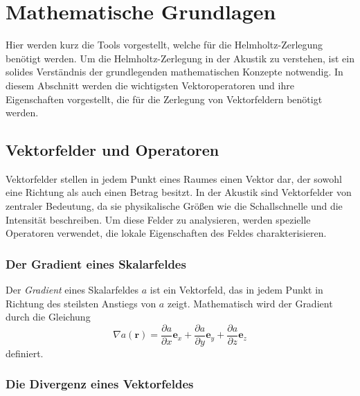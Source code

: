 %
%
%
%
\section{Mathematische Grundlagen
\label{helmholtz:section:Mahtematische_Grundlagen}}

Hier werden kurz die Tools vorgestellt, welche für die Helmholtz-Zerlegung
benötigt werden.
Um die Helmholtz-Zerlegung in der Akustik zu verstehen, ist ein
solides Verständnis der grundlegenden mathematischen Konzepte
notwendig.
In diesem Abschnitt werden die wichtigsten Vektoroperatoren und
ihre Eigenschaften vorgestellt, die für die Zerlegung von Vektorfeldern
benötigt werden.

\subsection{Vektorfelder und Operatoren
\label{helmholtz:subsection:Vektorfelder_Operatoren}}

Vektorfelder stellen in jedem Punkt eines Raumes einen Vektor dar,
der sowohl eine Richtung als auch einen Betrag besitzt.
In der Akustik sind Vektorfelder von zentraler Bedeutung, da sie
physikalische Größen wie die Schallschnelle und die Intensität
beschreiben.
Um diese Felder zu analysieren, werden spezielle Operatoren verwendet,
die lokale Eigenschaften des Feldes charakterisieren.

\subsubsection{Der Gradient eines Skalarfeldes}

Der \emph{Gradient} eines Skalarfeldes $a$ ist ein Vektorfeld, das in jedem
%
Punkt in Richtung des steilsten Anstiegs von $a$ zeigt.
Mathematisch wird der Gradient durch die Gleichung
\begin{equation}
\nabla a (\boldsymbol{r})
=
\frac{\partial a}{\partial x}\boldsymbol{e}_x
+
\frac{\partial a}{\partial y}\boldsymbol{e}_y
+
\frac{\partial a}{\partial z}\boldsymbol{e}_z
\end{equation}
definiert.



\subsubsection{Die Divergenz eines Vektorfeldes}

